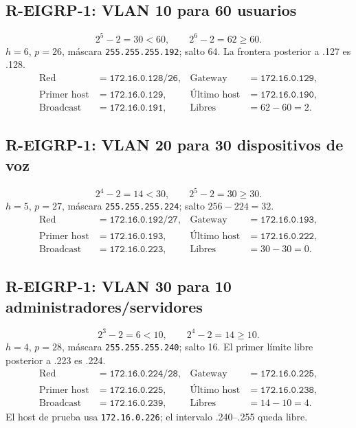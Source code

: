 \documentclass[11pt]{article}
\begin{document}
\subsection{R-EIGRP-1: VLAN 10 para 60 usuarios}
\begin{calculo}
\[
2^5-2=30<60,\qquad 2^6-2=62\ge60.
\]
$h=6$, $p=26$, máscara \texttt{255.255.255.192}; salto 64. La frontera posterior a .127 es .128.
\begin{align*}
\text{Red} &= \texttt{172.16.0.128/26}, & \text{Gateway} &= \texttt{172.16.0.129},\\
\text{Primer host} &= \texttt{172.16.0.129}, & \text{Último host} &= \texttt{172.16.0.190},\\
\text{Broadcast} &= \texttt{172.16.0.191}, & \text{Libres} &=62-60=2.
\end{align*}
\end{calculo}

\subsection{R-EIGRP-1: VLAN 20 para 30 dispositivos de voz}
\begin{calculo}
\[
2^4-2=14<30,\qquad 2^5-2=30\ge30.
\]
$h=5$, $p=27$, máscara \texttt{255.255.255.224}; salto $256-224=32$.
\begin{align*}
\text{Red} &= \texttt{172.16.0.192/27}, & \text{Gateway} &= \texttt{172.16.0.193},\\
\text{Primer host} &= \texttt{172.16.0.193}, & \text{Último host} &= \texttt{172.16.0.222},\\
\text{Broadcast} &= \texttt{172.16.0.223}, & \text{Libres} &=30-30=0.
\end{align*}
\end{calculo}

\subsection{R-EIGRP-1: VLAN 30 para 10 administradores/servidores}
\begin{calculo}
\[
2^3-2=6<10,\qquad 2^4-2=14\ge10.
\]
$h=4$, $p=28$, máscara \texttt{255.255.255.240}; salto 16. El primer límite libre posterior a .223 es .224.
\begin{align*}
\text{Red} &= \texttt{172.16.0.224/28}, & \text{Gateway} &= \texttt{172.16.0.225},\\
\text{Primer host} &= \texttt{172.16.0.225}, & \text{Último host} &= \texttt{172.16.0.238},\\
\text{Broadcast} &= \texttt{172.16.0.239}, & \text{Libres} &=14-10=4.
\end{align*}
El host de prueba usa \texttt{172.16.0.226}; el intervalo .240--.255 queda libre.
\end{calculo}
\end{document}
